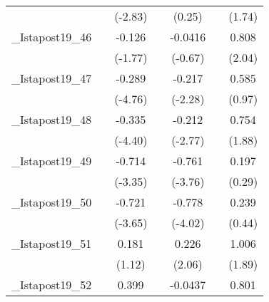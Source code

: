 {\begin{tabular}{l*{6}{c}}
            &                     &     (-2.83)         &                     &      (0.25)         &                     &      (1.74)         \\
[1em]
\_Istapost19\_46&                     &      -0.126         &                     &     -0.0416         &                     &       0.808\sym{*}  \\
            &                     &     (-1.77)         &                     &     (-0.67)         &                     &      (2.04)         \\
[1em]
\_Istapost19\_47&                     &      -0.289\sym{***}&                     &      -0.217\sym{*}  &                     &       0.585         \\
            &                     &     (-4.76)         &                     &     (-2.28)         &                     &      (0.97)         \\
[1em]
\_Istapost19\_48&                     &      -0.335\sym{***}&                     &      -0.212\sym{**} &                     &       0.754         \\
            &                     &     (-4.40)         &                     &     (-2.77)         &                     &      (1.88)         \\
[1em]
\_Istapost19\_49&                     &      -0.714\sym{**} &                     &      -0.761\sym{***}&                     &       0.197         \\
            &                     &     (-3.35)         &                     &     (-3.76)         &                     &      (0.29)         \\
[1em]
\_Istapost19\_50&                     &      -0.721\sym{***}&                     &      -0.778\sym{***}&                     &       0.239         \\
            &                     &     (-3.65)         &                     &     (-4.02)         &                     &      (0.44)         \\
[1em]
\_Istapost19\_51&                     &       0.181         &                     &       0.226\sym{*}  &                     &       1.006         \\
            &                     &      (1.12)         &                     &      (2.06)         &                     &      (1.89)         \\
[1em]
\_Istapost19\_52&                     &       0.399\sym{**} &                     &     -0.0437         &                     &       0.801\sym{*}  \\

\end{tabular}}
